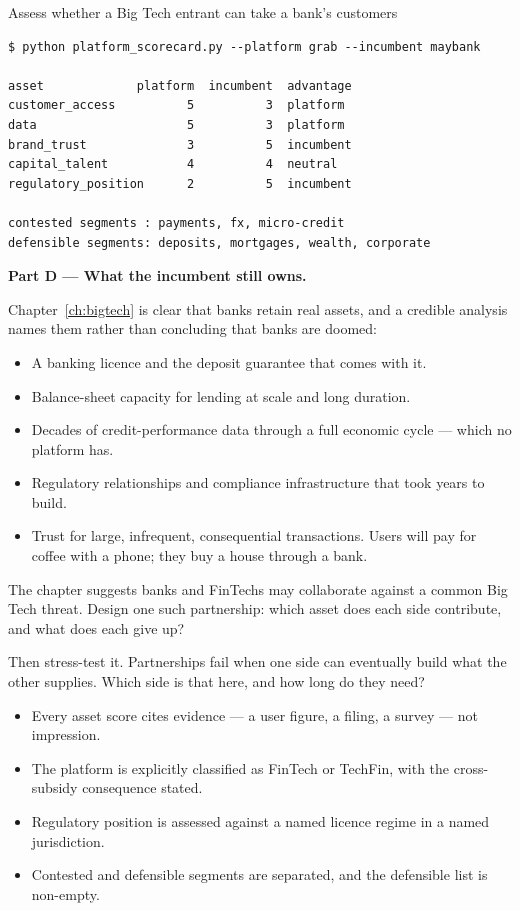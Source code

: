 \begin{labproject}{Assess whether a Big Tech entrant can take a bank's customers}
\begin{lstlisting}[style=mlterminal]
$ python platform_scorecard.py --platform grab --incumbent maybank

asset             platform  incumbent  advantage
customer_access          5          3  platform
data                     5          3  platform
brand_trust              3          5  incumbent
capital_talent           4          4  neutral
regulatory_position      2          5  incumbent

contested segments : payments, fx, micro-credit
defensible segments: deposits, mortgages, wealth, corporate
\end{lstlisting}

\medskip\noindent\textbf{Part D --- What the incumbent still owns.}\par
Chapter~\ref{ch:bigtech} is clear that banks retain real assets, and a credible analysis names them rather than concluding that banks are doomed:

\begin{itemize}
  \item A banking licence and the deposit guarantee that comes with it.
  \item Balance-sheet capacity for lending at scale and long duration.
  \item Decades of credit-performance data through a full economic cycle --- which no platform has.
  \item Regulatory relationships and compliance infrastructure that took years to build.
  \item Trust for large, infrequent, consequential transactions. Users will pay for coffee with a phone; they buy a house through a bank.
\end{itemize}

\begin{tryit}
The chapter suggests banks and FinTechs may collaborate against a common Big Tech threat. Design one such partnership: which asset does each side contribute, and what does each give up?

Then stress-test it. Partnerships fail when one side can eventually build what the other supplies. Which side is that here, and how long do they need?
\end{tryit}
\end{labproject}

\begin{verification}
\begin{itemize}
  \item Every asset score cites evidence --- a user figure, a filing, a survey --- not impression.
  \item The platform is explicitly classified as FinTech or TechFin, with the cross-subsidy consequence stated.
  \item Regulatory position is assessed against a named licence regime in a named jurisdiction.
  \item Contested and defensible segments are separated, and the defensible list is non-empty.
\end{itemize}
\end{verification}

